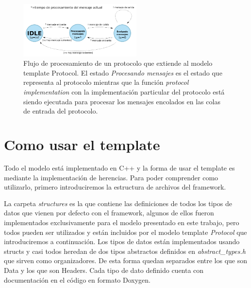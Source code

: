\documentclass[10pt,a4paper]{article}
\begin{document}
\begin{figure}[!bht]
    \centering
    \includegraphics[width = 0.55\textwidth]{img/png/processing_flow.png}
    \caption{Flujo de procesamiento de un protocolo que extiende al modelo template Protocol. El estado \textit{Procesando mensajes} es el estado que representa al protocolo mientras que la función \textit{protocol implementation} con la implementación particular del protocolo está siendo ejecutada para procesar los mensajes encolados en las colas de entrada del protocolo.}
    \label{figure:processing flow}
\end{figure}

\newpage

\section{Como usar el template}

Todo el modelo está implementado en C++ y la forma de usar el template es mediante la implementación de herencias. Para poder comprender como utilizarlo, primero introduciremos la estructura de archivos del framework. \\


\medskip

La carpeta \textit{structures} es la que contiene las definiciones de todos los tipos de datos que vienen por defecto con el framework, algunos de ellos fueron implementados exclusivamente para el modelo presentado en este trabajo, pero todos pueden ser utilizados y están incluidos por el modelo template \textit{Protocol} que introduciremos a continuación. Los tipos de datos están implementados usando structs y casi todos heredan de dos tipos abstractos definidos en \textit{abstract\_types.h} que sirven como organizadores. De esta forma quedan separados entre los que son Data y los que son Headers. Cada tipo de dato definido cuenta con documentación en el código en formato Doxygen. \\
\end{document}
